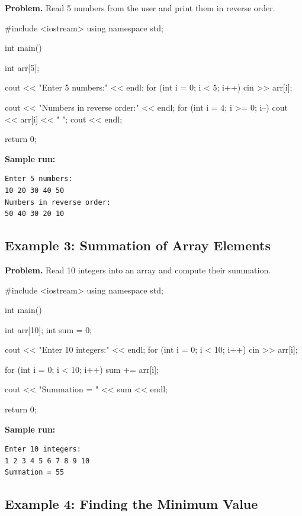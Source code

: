 \textbf{Problem.} Read 5 numbers from the user and print them in reverse
order.

\begin{cppcode}
#include <iostream>
using namespace std;

int main() {
    int arr[5];

    cout << "Enter 5 numbers:" << endl;
    for (int i = 0; i < 5; i++) {
        cin >> arr[i];
    }

    cout << "Numbers in reverse order:" << endl;
    for (int i = 4; i >= 0; i--) {
        cout << arr[i] << " ";
    }
    cout << endl;

    return 0;
}
\end{cppcode}

\textbf{Sample run:}
\begin{verbatim}
Enter 5 numbers:
10 20 30 40 50
Numbers in reverse order:
50 40 30 20 10
\end{verbatim}

\subsection{Example 3: Summation of Array Elements}

\textbf{Problem.} Read 10 integers into an array and compute their
summation.

\begin{cppcode}
#include <iostream>
using namespace std;

int main() {
    int arr[10];
    int sum = 0;

    cout << "Enter 10 integers:" << endl;
    for (int i = 0; i < 10; i++) {
        cin >> arr[i];
    }

    for (int i = 0; i < 10; i++) {
        sum += arr[i];
    }

    cout << "Summation = " << sum << endl;

    return 0;
}
\end{cppcode}

\textbf{Sample run:}
\begin{verbatim}
Enter 10 integers:
1 2 3 4 5 6 7 8 9 10
Summation = 55
\end{verbatim}

\subsection{Example 4: Finding the Minimum Value}


